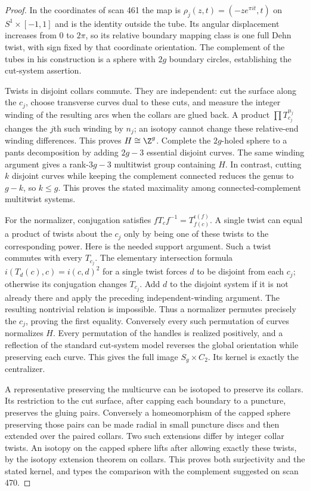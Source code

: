 \begin{proof}
In the coordinates of scan 461 the map is
$\rho_j(z,t)=(-z e^{\pi i t},t)$ on $S^1\times[-1,1]$ and is the identity outside
the tube. Its angular displacement increases from $0$ to $2\pi$, so its relative
boundary mapping class is one full Dehn twist, with sign fixed by that coordinate
orientation. The complement of the tubes in his construction is a sphere with
$2g$ boundary circles, establishing the cut-system assertion.

Twists in disjoint collars commute. They are independent: cut the surface along
the $c_j$, choose transverse curves dual to these cuts, and measure the integer
winding of the resulting arcs when the collars are glued back. A product
$\prod T_{c_j}^{n_j}$ changes the $j$th such winding by $n_j$; an isotopy cannot
change these relative-end winding differences. This proves $H\cong\Z^g$.
Complete the $2g$-holed sphere to a pants decomposition by adding $2g-3$
essential disjoint curves. The same winding argument gives a rank-$3g-3$
multitwist group containing $H$. In contrast, cutting $k$ disjoint curves while
keeping the complement connected reduces the genus to $g-k$, so $k\le g$.
This proves the stated maximality among connected-complement multitwist systems.

For the normalizer, conjugation satisfies
$fT_cf^{-1}=T_{f(c)}^{\epsilon(f)}$. A single twist can equal a product of twists
about the $c_j$ only by being one of these twists to the corresponding power.
Here is the needed support argument. Such a twist commutes with every $T_{c_j}$.
The elementary intersection formula
$i(T_d(c),c)=i(c,d)^2$ for a single twist forces $d$ to be disjoint from each
$c_j$; otherwise its conjugation changes $T_{c_j}$. Add $d$ to the disjoint
system if it is not already there and apply the preceding independent-winding
argument. The resulting nontrivial relation is impossible. Thus a normalizer
permutes precisely the $c_j$, proving the first equality. Conversely every such
permutation of curves normalizes $H$. Every permutation of the handles is
realized positively, and a reflection of the standard cut-system model reverses
the global orientation while preserving each curve. This gives the full image
$S_g\times C_2$. Its kernel is exactly the centralizer.

A representative preserving the multicurve can be isotoped to preserve its
collars. Its restriction to the cut surface, after capping each boundary to a
puncture, preserves the gluing pairs. Conversely a homeomorphism of the capped
sphere preserving those pairs can be made radial in small puncture discs and
then extended over the paired collars. Two such extensions differ by integer
collar twists. An isotopy on the capped sphere lifts after allowing exactly
these twists, by the isotopy extension theorem on collars. This proves both
surjectivity and the stated kernel, and types the comparison with the
complement suggested on scan 470.
\end{proof}

